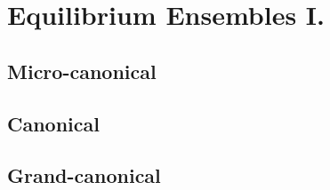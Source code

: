 
\section{Equilibrium Ensembles I.}

\subsection{Micro-canonical}

\subsection{Canonical}

\subsection{Grand-canonical}
